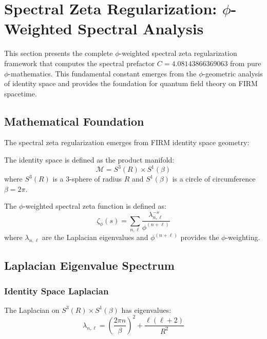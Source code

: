 \section{Spectral Zeta Regularization: $\phi$-Weighted Spectral Analysis}

This section presents the complete $\phi$-weighted spectral zeta regularization framework that computes the spectral prefactor $C = 4.08143866369063$ from pure $\phi$-mathematics. This fundamental constant emerges from the $\phi$-geometric analysis of identity space and provides the foundation for quantum field theory on FIRM spacetime.

\subsection{Mathematical Foundation}

The spectral zeta regularization emerges from FIRM identity space geometry:

\begin{definition}
The identity space is defined as the product manifold:
\begin{equation}
\mathcal{M} = S^3(R) \times S^1(\beta)
\end{equation}
where $S^3(R)$ is a 3-sphere of radius $R$ and $S^1(\beta)$ is a circle of circumference $\beta = 2\pi$.
\end{definition}

\begin{definition}
The $\phi$-weighted spectral zeta function is defined as:
\begin{equation}
\zeta_\phi(s) = \sum_{n,\ell} \frac{\lambda_{n,\ell}^{-s}}{\phi^{(n+\ell)}}
\end{equation}
where $\lambda_{n,\ell}$ are the Laplacian eigenvalues and $\phi^{(n+\ell)}$ provides the $\phi$-weighting.
\end{definition}

\subsection{Laplacian Eigenvalue Spectrum}

\subsubsection{Identity Space Laplacian}

The Laplacian on $S^3(R) \times S^1(\beta)$ has eigenvalues:
\begin{equation}
\lambda_{n,\ell} = \left(\frac{2\pi n}{\beta}\right)^2 + \frac{\ell(\ell+2)}{R^2}
\end{equation}

